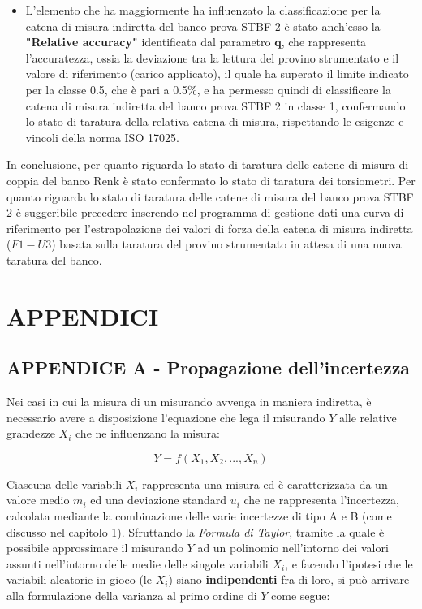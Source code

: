 \documentclass[a4paper, twoside]{article}
\begin{document}
\begin{itemize}
    \item L'elemento che ha maggiormente ha influenzato la classificazione per la catena di misura indiretta del banco prova STBF 2 è stato anch'esso la \textbf{"Relative accuracy"} identificata dal parametro $\mathbf{q}$, che rappresenta l'accuratezza, ossia la deviazione tra la lettura del provino strumentato e il valore di riferimento (carico applicato), il quale ha superato il limite indicato per la classe 0.5, che è pari a 0.5\%, e ha permesso quindi di classificare la catena di misura indiretta del banco prova STBF 2 in classe 1, confermando lo stato di taratura della relativa catena di misura, rispettando le esigenze e vincoli della norma ISO 17025.

\end{itemize}

In conclusione, per quanto riguarda lo stato di taratura delle catene di misura di coppia del banco Renk è stato confermato lo stato di taratura dei torsiometri. Per quanto riguarda lo stato di taratura delle catene di misura del banco prova STBF 2 è suggeribile precedere inserendo nel programma di gestione dati una curva di riferimento per l'estrapolazione dei valori di forza della catena di misura indiretta ($F1-U3$) basata sulla taratura del provino strumentato in attesa di una nuova taratura del banco.

    \newpage

\section{APPENDICI}

\subsection{APPENDICE A - Propagazione dell'incertezza}

Nei casi in cui la misura di un misurando avvenga in maniera indiretta, è necessario avere a disposizione l'equazione che lega il misurando $Y$ alle relative grandezze $X_i$ che ne influenzano la misura:

\begin{equation}
    Y=f(X_1, X_2, ..., X_n)
\end{equation}

Ciascuna delle variabili $X_i$ rappresenta una misura ed è caratterizzata da un valore medio $m_i$ ed una deviazione standard $u_i$ che ne rappresenta l'incertezza, calcolata mediante la combinazione delle varie incertezze di tipo A e B (come discusso nel capitolo 1). Sfruttando la \textit{Formula di Taylor}, tramite la quale è possibile approssimare il misurando $Y$ ad un polinomio nell'intorno dei valori assunti nell'intorno delle medie delle singole variabili $X_i$, e facendo l'ipotesi che le variabili aleatorie in gioco (le $X_i$) siano \textbf{indipendenti} fra di loro, si può arrivare alla formulazione della varianza al primo ordine di $Y$ come segue:
\end{document}
